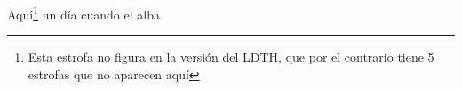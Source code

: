 Aquí\footnote{\textsuperscript{}Esta estrofa no figura en la versión del LDTH, que por el contrario tiene 5 estrofas que no aparecen aquí} un día cuando el alba
